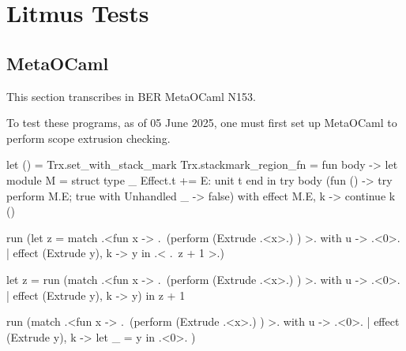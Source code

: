 \chapter{Litmus Tests}

\section{MetaOCaml}\label{section:metaocaml-litmustests}
This section transcribes  in BER MetaOCaml N153. 

To test these programs, as of 05 June 2025, one must first set up MetaOCaml to perform scope extrusion checking.

\begin{metaocaml}
let () =  Trx.set_with_stack_mark
  {Trx.stackmark_region_fn =
      fun body ->
        let module M = struct type _ Effect.t += E: unit t end in
        try body (fun () -> try perform M.E; true with Unhandled _ -> false)
        with effect M.E, k -> continue k ()}
\end{metaocaml}

\begin{code}
\begin{metaocaml}
run (let z  = match .<fun x -> .~(perform (Extrude .<x>.) ) >. 
             with u -> .<0>.
                | effect (Extrude y), k -> y
     in .< .~z + 1 >.)
\end{metaocaml}
\label{}
\end{code}

\begin{code}
\begin{metaocaml}
let z = run (match .<fun x -> .~(perform (Extrude .<x>.) ) >. 
             with u -> .<0>.
                | effect (Extrude y), k -> y) 
in z + 1
\end{metaocaml}
\end{code}

\begin{code}
\begin{metaocaml}
run (match .<fun x -> .~(perform (Extrude .<x>.) ) >. 
             with u -> .<0>.
                | effect (Extrude y), k -> let _ = y in .<0>. )
\end{metaocaml}
\end{code}


